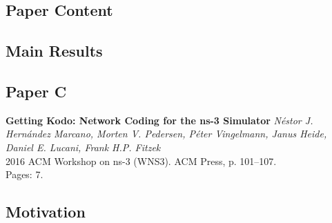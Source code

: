 \subsection*{Paper Content}
\subsection*{Main Results}
\clearpage


\subsection{Paper C}
\textbf{Getting Kodo: Network Coding for the ns-3 Simulator}
\textit{N\'estor J. Hern\'andez Marcano, Morten V. Pedersen, P\'eter
Vingelmann, Janus Heide, Daniel E. Lucani, Frank H.P. Fitzek}
\\ 2016 ACM Workshop on ns-3 (WNS3). ACM Press, p. 101--107.
\\ Pages: 7.
\subsection*{Motivation}
